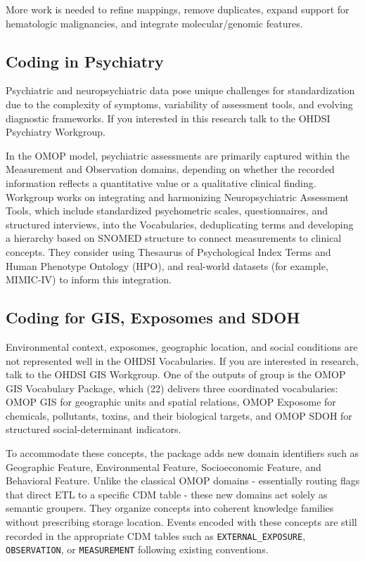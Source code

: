 \documentclass[
  letterpaper,
  paper=7in:10in,
  pagesize=pdftex,
  headinclude=on,
  footinclude=on,
  12pt]{scrbook}
\begin{document}
More work is needed to refine mappings, remove duplicates, expand
support for hematologic malignancies, and integrate molecular/genomic
features.

\subsection{Coding in Psychiatry}\label{coding-in-psychiatry}

Psychiatric and neuropsychiatric data pose unique challenges for
standardization due to the complexity of symptoms, variability of
assessment tools, and evolving diagnostic frameworks. If you interested
in this research talk to the OHDSI Psychiatry Workgroup.

In the OMOP model, psychiatric assessments are primarily captured within
the Measurement and Observation domains, depending on whether the
recorded information reflects a quantitative value or a qualitative
clinical finding. Workgroup works on integrating and harmonizing
Neuropsychiatric Assessment Tools, which include standardized
psychometric scales, questionnaires, and structured interviews, into the
Vocabularies, deduplicating terms and developing a hierarchy based on
SNOMED structure to connect measurements to clinical concepts. They
consider using Thesaurus of Psychological Index Terms and Human
Phenotype Ontology (HPO), and real-world datasets (for example,
MIMIC-IV) to inform this integration.

\subsection{Coding for GIS, Exposomes and
SDOH}\label{coding-for-gis-exposomes-and-sdoh}

Environmental context, exposomes, geographic location, and social
conditions are not represented well in the OHDSI Vocabularies. If you
are interested in research, talk to the OHDSI GIS Workgroup. One of the
outputs of group is the OMOP GIS Vocabulary Package, which (22) delivers
three coordinated vocabularies: OMOP GIS for geographic units and
spatial relations, OMOP Exposome for chemicals, pollutants, toxins, and
their biological targets, and OMOP SDOH for structured
social-determinant indicators.

To accommodate these concepts, the package adds new domain identifiers
such as Geographic Feature, Environmental Feature, Socioeconomic
Feature, and Behavioral Feature. Unlike the classical OMOP domains -
essentially routing flags that direct ETL to a specific CDM table -
these new domains act solely as semantic groupers. They organize
concepts into coherent knowledge families without prescribing storage
location. Events encoded with these concepts are still recorded in the
appropriate CDM tables such as \texttt{EXTERNAL\_EXPOSURE},
\texttt{OBSERVATION}, or \texttt{MEASUREMENT} following existing
conventions.
\end{document}
